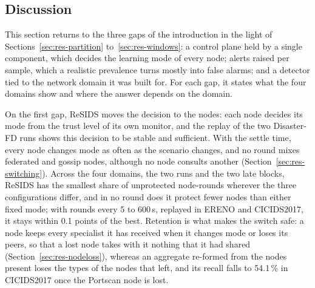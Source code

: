 \subsection{Discussion}
\label{sec:res-discussion}


This section returns to the three gaps of the introduction in the light of Sections~\ref{sec:res-partition} to~\ref{sec:res-windows}: a control plane held by a single component, which decides the learning mode of every node; alerts raised per sample, which a realistic prevalence turns mostly into false alarms; and a detector tied to the network domain it was built for. For each gap, it states what the four domains show and where the answer depends on the domain.

On the first gap, ReSIDS moves the decision to the nodes: each node decides its mode from the trust level of its own monitor, and the replay of the two Disaster-FD runs shows this decision to be stable and sufficient. With the settle time, every node changes mode as often as the scenario changes, and no round mixes federated and gossip nodes, although no node consults another (Section~\ref{sec:res-switching}). Across the four domains, the two runs and the two late blocks, ReSIDS has the smallest share of unprotected node-rounds wherever the three configurations differ, and in no round does it protect fewer nodes than either fixed mode; with rounds every 5 to 600\,s, replayed in ERENO and CICIDS2017, it stays within 0.1 points of the best. Retention is what makes the switch safe: a node keeps every specialist it has received when it changes mode or loses its peers, so that a lost node takes with it nothing that it had shared (Section~\ref{sec:res-nodeloss}), whereas an aggregate re-formed from the nodes present loses the types of the nodes that left, and its recall falls to 54.1\,\% in CICIDS2017 once the Portscan node is lost.

